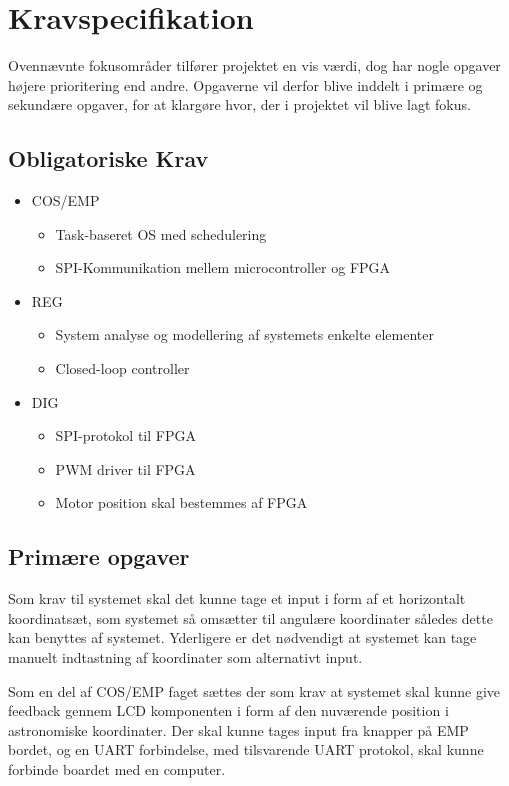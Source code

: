\section{Kravspecifikation}

Ovennævnte fokusområder tilfører projektet en vis værdi, dog har nogle opgaver højere prioritering end andre. Opgaverne vil derfor blive inddelt i primære og sekundære opgaver, for at klargøre hvor, der i projektet vil blive lagt fokus.

\subsection{Obligatoriske Krav}

\begin{itemize}[noitemsep]
	\item COS/EMP
	\begin{itemize}[noitemsep]
		\item Task-baseret OS med schedulering
		\item SPI-Kommunikation mellem microcontroller og FPGA
	\end{itemize}
	\item REG
	\begin{itemize}[noitemsep]
		\item System analyse og modellering af systemets enkelte elementer
		\item Closed-loop controller
	\end{itemize}
	\item DIG
	\begin{itemize}[noitemsep]
		\item SPI-protokol til FPGA
		\item PWM driver til FPGA
		\item Motor position skal bestemmes af FPGA
	\end{itemize}
\end{itemize}

\subsection{Primære opgaver}

Som krav til systemet skal det kunne tage et input i form af et horizontalt koordinatsæt, som systemet så omsætter til angulære koordinater således dette kan benyttes af systemet. Yderligere er det nødvendigt at systemet kan tage manuelt indtastning af koordinater som alternativt input.

Som en del af COS/EMP faget sættes der som krav at systemet skal kunne give feedback gennem LCD komponenten i form af den nuværende position i astronomiske koordinater. Der skal kunne tages input fra knapper på EMP bordet, og en UART forbindelse, med tilsvarende UART protokol, skal kunne forbinde boardet med en computer.


